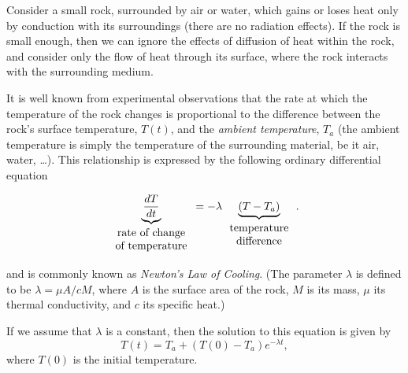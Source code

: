 \documentclass{article}
\begin{document}
\begin{example}

  \label{lab1:exm:conduction}

  Consider a small rock, surrounded by air or water, which gains or
  loses heat only by conduction with its surroundings 
  (\ie there are no radiation effects).
  If the rock is small enough, then we can ignore the effects of
  diffusion of heat within the rock, and consider only the flow of heat
  through its surface, where the rock interacts with the surrounding
  medium.  

  It is well known from experimental observations that the 
  rate at which the temperature of the rock changes
  is proportional to 
  the difference between the rock's surface temperature, $T(t)$, 
    and the \emph{ambient temperature}, $T_a$
  (the ambient temperature is
  simply the temperature of the surrounding material, be it air,
  water, \dots).
  This relationship is expressed by the following ordinary
  differential equation

  \begin{equation}
    \underbrace{\frac{dT}{dt}}_{\begin{array}{c} 
                                \mbox{\rm rate of change}\\
                                \mbox{\rm of temperature}
                                \end{array}}
    = -\lambda \underbrace{(T-T_a)}_{\begin{array}{c} 
                                \mbox{\rm temperature}\\
                                \mbox{\rm difference}
                                \end{array}} .
    \label{lab1:eq:conduction1d}
  \end{equation}

  and is commonly known as \emph{Newton's Law of Cooling}.
  (The parameter $\lambda$ is defined to be $\lambda = \mu A/cM$, where
  $A$ is the surface area of the rock, 
  $M$ is its mass, $\mu$ its thermal conductivity, and $c$ its
  specific heat.)

  
  If we assume that $\lambda$ is a constant, then the solution to this
  equation is given by 
  \begin{equation}
    T(t) = T_a + (T(0)-T_a)e^{-\lambda t},
    \label{lab1:eq:conduction-soln}
  \end{equation}
  where $T(0)$ is the initial temperature.  

\end{example}
\end{document}
